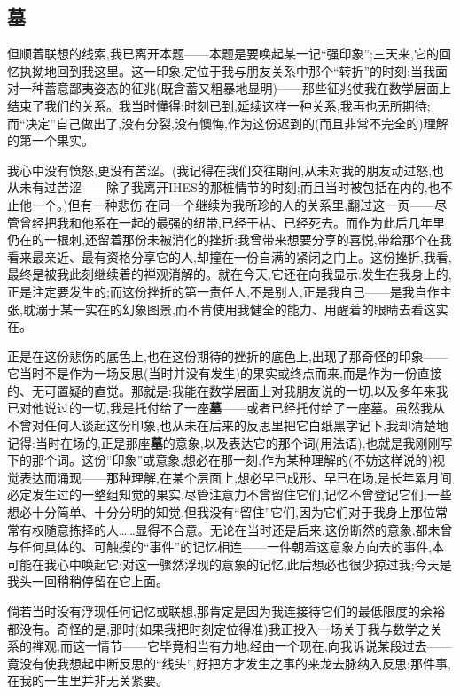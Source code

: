 \subsection{墓}


但顺着联想的线索,我已离开本题——本题是要唤起某一记“强印象”;三天来,它的回忆执拗地回到我这里。这一印象,定位于我与朋友关系中那个“转折”的时刻:当我面对一种蓄意鄙夷姿态的征兆(既含蓄又粗暴地显明)——那些征兆使我在数学层面上结束了我们的关系。我当时懂得:时刻已到,延续这样一种关系,我再也无所期待;而“决定”自己做出了,没有分裂,没有懊悔,作为这份迟到的(而且非常不完全的)理解的第一个果实。

我心中没有愤怒,更没有苦涩。(我记得在我们交往期间,从未对我的朋友动过怒,也从未有过苦涩——除了我离开IHES的那桩情节的时刻;而且当时被包括在内的,也不止他一个。)但有一种悲伤:在同一个继续为我所珍的人的关系里,翻过这一页——尽管曾经把我和他系在一起的最强的纽带,已经干枯、已经死去。而作为此后几年里仍在的一根刺,还留着那份未被消化的挫折:我曾带来想要分享的喜悦,带给那个在我看来最亲近、最有资格分享它的人,却撞在一份自满的紧闭之门上。这份挫折,我看,最终是被我此刻继续着的禅观消解的。就在今天,它还在向我显示:发生在我身上的,正是注定要发生的;\dmark{}而这份挫折的第一责任人,不是别人,正是我自己——是我自作主张,耽溺于某一实在的幻象图景,而不肯使用我健全的能力、用醒着的眼睛去看这实在。

正是在这份悲伤的底色上,也在这份期待的挫折的底色上,出现了那奇怪的印象——它当时不是作为一场反思(当时并没有发生)的果实或终点而来,而是作为一份直接的、无可置疑的直觉。那就是:我能在数学层面上对我朋友说的一切,以及多年来我已对他说过的一切,我是托付给了一座\textbf{墓}——或者已经托付给了一座墓。虽然我从不曾对任何人谈起这份印象,也从未在后来的反思里把它白纸黑字记下,我却清楚地记得:当时在场的,正是那座\textbf{墓}的意象,以及表达它的那个词(用法语),也就是我刚刚写下的那个词。这份“印象”或意象,想必在那一刻,作为某种理解的(不妨这样说的)视觉表达而涌现——那种理解,在某个层面上,想必早已成形、早已在场,是长年累月间必定发生过的一整组知觉的果实,尽管注意力不曾留住它们,记忆不曾登记它们;一些想必十分简单、十分分明的知觉,但我没有“留住”它们,因为它们对于我身上那位常常有权随意拣择的人……显得不合意。无论在当时还是后来,这份断然的意象,都未曾与任何具体的、可触摸的“事件”的记忆相连——一件朝着这意象方向去的事件,本可能在我心中唤起它;对这一骤然浮现的意象的记忆,此后想必也很少掠过我;今天是我头一回稍稍停留在它上面。

倘若当时没有浮现任何记忆或联想,那肯定是因为我连接待它们的最低限度的余裕都没有。奇怪的是,那时(如果我把时刻定位得准)我正投入一场关于我与数学之关系的禅观,而这一情节——它毕竟相当有力地,经由一个现在,向我诉说某段过去——竟没有使我想起中断反思的“线头”,好把方才发生之事的来龙去脉纳入反思;那件事,在我的一生里并非无关紧要。

